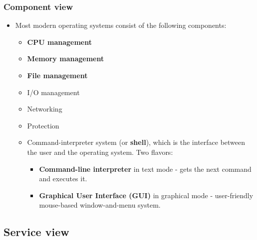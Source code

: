 \documentclass[CJKutf8,xcolor=pdftex,dvipsnames,table]{beamer}
\begin{document}
\begin{CJK*}{UTF8}{song}
  \begin{frame}
    \frametitle{Component view} \pause
    \begin{itemize}
    \item{Most modern operating systems consist of the following components:} \pause
      \begin{itemize}
      \item{\textbf{CPU management}} \pause
      \item{\textbf{Memory management}} \pause
      \item{\textbf{File management}} \pause
      \item{I/O management} \pause
      \item{Networking}  \pause
      \item{Protection} \pause
      \item{Command-interpreter system (or \textbf{shell}), which is the interface between the user and the operating system. Two flavors:} \pause
        \begin{itemize}
        \item{\textbf{Command-line interpreter} in text mode \pause - gets the next command and executes it.} \pause
        \item{\textbf{Graphical User Interface (GUI)} in graphical mode \pause - user-friendly mouse-based window-and-menu system.}
        \end{itemize}
      \end{itemize}
    \end{itemize}
  \end{frame}

  \subsection{Service view}


\end{CJK*}
\end{document}
